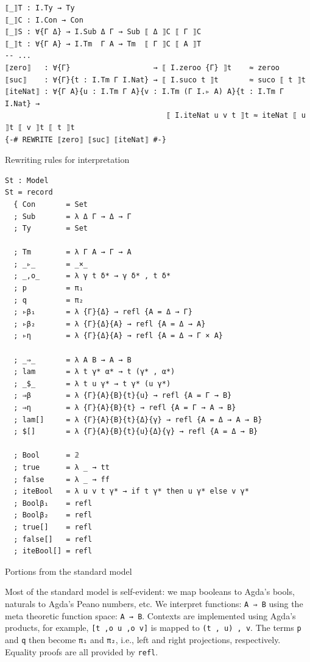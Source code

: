 \begin{listing}[H]
\begin{verbatim}
⟦_⟧T : I.Ty → Ty
⟦_⟧C : I.Con → Con
⟦_⟧S : ∀{Γ Δ} → I.Sub Δ Γ → Sub ⟦ Δ ⟧C ⟦ Γ ⟧C
⟦_⟧t : ∀{Γ A} → I.Tm  Γ A → Tm  ⟦ Γ ⟧C ⟦ A ⟧T
-- ...
⟦zero⟧   : ∀{Γ}                   → ⟦ I.zeroo {Γ} ⟧t    ≈ zeroo
⟦suc⟧    : ∀{Γ}{t : I.Tm Γ I.Nat} → ⟦ I.suco t ⟧t       ≈ suco ⟦ t ⟧t
⟦iteNat⟧ : ∀{Γ A}{u : I.Tm Γ A}{v : I.Tm (Γ I.▹ A) A}{t : I.Tm Γ I.Nat} →
                                     ⟦ I.iteNat u v t ⟧t ≈ iteNat ⟦ u ⟧t ⟦ v ⟧t ⟦ t ⟧t
{-# REWRITE ⟦zero⟧ ⟦suc⟧ ⟦iteNat⟧ #-}
\end{verbatim}
\caption{Rewriting rules for interpretation}
\label{code:ot-rewriting}
\end{listing}

\begin{listing}[H]
\begin{verbatim}
St : Model
St = record
  { Con       = Set
  ; Sub       = λ Δ Γ → Δ → Γ
  ; Ty        = Set

  ; Tm        = λ Γ A → Γ → A
  ; _▹_       = _×_
  ; _,o_      = λ γ t δ* → γ δ* , t δ*
  ; p         = π₁
  ; q         = π₂
  ; ▹β₁       = λ {Γ}{Δ} → refl {A = Δ → Γ}
  ; ▹β₂       = λ {Γ}{Δ}{A} → refl {A = Δ → A}
  ; ▹η        = λ {Γ}{Δ}{A} → refl {A = Δ → Γ × A}

  ; _⇒_       = λ A B → A → B
  ; lam       = λ t γ* α* → t (γ* , α*)
  ; _$_       = λ t u γ* → t γ* (u γ*)
  ; ⇒β        = λ {Γ}{A}{B}{t}{u} → refl {A = Γ → B}
  ; ⇒η        = λ {Γ}{A}{B}{t} → refl {A = Γ → A → B}
  ; lam[]     = λ {Γ}{A}{B}{t}{Δ}{γ} → refl {A = Δ → A → B}
  ; $[]       = λ {Γ}{A}{B}{t}{u}{Δ}{γ} → refl {A = Δ → B}

  ; Bool      = 𝟚
  ; true      = λ _ → tt
  ; false     = λ _ → ff
  ; iteBool   = λ u v t γ* → if t γ* then u γ* else v γ*
  ; Boolβ₁    = refl
  ; Boolβ₂    = refl
  ; true[]    = refl
  ; false[]   = refl
  ; iteBool[] = refl
\end{verbatim}
\caption{Portions from the standard model}
\label{code:ot-st-model}
\end{listing}

Most of the standard model is self-evident: we map booleans to Agda's bools, naturals to Agda's Peano numbers, etc. We interpret functions: \verb$A ⇒ B$ using the meta theoretic function space: \verb$A → B$. Contexts are implemented using Agda's products, for example, \verb$[t ,o u ,o v]$ is mapped to \verb$(t , u) , v$. The terms \verb$p$ and \verb$q$ then become \verb$π₁$ and \verb$π₂$, i.e., left and right projections, respectively. Equality proofs are all provided by \verb$refl$.

